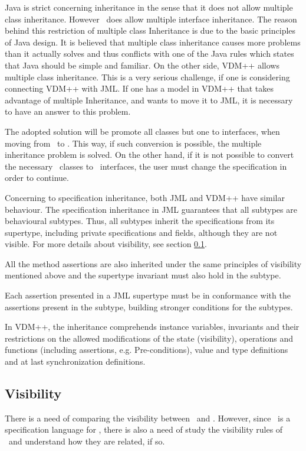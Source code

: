 Java is strict concerning inheritance in the sense that it does not allow multiple class inheritance. However \java\  does allow multiple interface inheritance. The reason behind this restriction of multiple class Inheritance is due to the basic principles of Java design. It is believed that multiple class inheritance causes more problems than it actually solves and thus conflicts with one of the Java rules which states that Java should be simple and familiar. On the other side, VDM++ allows multiple class inheritance.
This is a very serious challenge, if one is considering connecting VDM++ with JML. If one has a model in VDM++ that takes advantage of multiple Inheritance, and wants to move it to JML, it is necessary to have an answer to this problem. 

The adopted solution will be promote all classes but one to interfaces, when moving from \vpp\ to \jml. This way, if such conversion is possible, the multiple inheritance problem is solved. On the other hand, if it is not possible to convert the necessary \vpp\ classes to \java\ interfaces, the user must change the specification in order to continue.

Concerning to specification inheritance, both JML and VDM++ have similar behaviour.
The specification inheritance in JML guarantees that all subtypes are behavioural subtypes. Thus, all subtypes inherit the specifications from its supertype, including private specifications and fields, although they are not visible. For more details about visibility, see section \ref{chap2:visib}.

All the method assertions are also inherited under the same principles of visibility mentioned above and the supertype invariant must also hold in the subtype.

Each assertion presented in a JML supertype must be in conformance with the assertions present in the subtype, building stronger conditions for the subtypes.

In VDM++, the inheritance comprehends instance variables, invariants and their restrictions on the allowed modifications of the state (visibility), operations and functions (including assertions, e.g. Pre-conditions), value and type definitions and at last synchronization definitions.

\subsection{Visibility}
\label{chap2:visib}

There is a need of comparing the visibility between \vpp\ and \jml. However, since \jml\ is a specification language for \java, there is also a need of study the visibility rules of \java\ and understand how they are related, if so.

